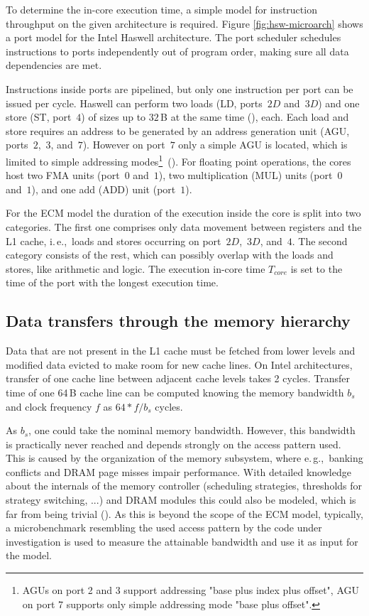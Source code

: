 To determine the in-core execution time, a simple model for instruction throughput on the given architecture is required. Figure \ref{fig:hsw-microarch} shows a port model for the Intel Haswell architecture. The port scheduler schedules instructions to ports independently out of program order, making sure all data dependencies are met.

Instructions inside ports are pipelined, but only one instruction per port can
be issued per cycle.
Haswell can perform two loads (LD, ports~$2D$ and~$3D$) and one store (ST,
port~$4$) of sizes up to $32$\,B at the same time (\cite{intel-orm-2016}), each.
Each load and store requires an address to be generated by an address
generation unit (AGU, ports~$2$,~$3$, and~$7$).
However on port~$7$ only a simple AGU is located, which is limited to simple
addressing modes\footnote{AGUs on port 2 and 3 support addressing "base plus index plus offset", AGU on port 7 supports only simple addressing mode "base plus offset".}~(\cite{intel-orm-2016,hofmann-2016-hsw}).
%
For floating point operations, the cores host two 
FMA units (port~$0$ and~$1$), two multiplication (MUL) units (port~$0$
and~$1$), and one add (ADD) unit (port~$1$).

For the ECM model the duration of the execution inside the core is split into
two categories.
The first one comprises only data movement between registers and the L1 cache,
i.\,e.,\ loads and stores occurring on port~$2D$,~$3D$, and~$4$.
The second category consists of the rest, which can possibly overlap with the
loads and stores, like arithmetic and logic.
The execution in-core time $T_{core}$ is set to the time of the port with the longest execution time.

\subsection*{Data transfers through the memory hierarchy}

Data that are not present in the L1 cache must be fetched from lower levels and modified data evicted to make room for new cache lines.
On Intel architectures, transfer of one cache line between adjacent cache levels takes 2 cycles.
Transfer time of one 64\,B cache line can be computed knowing the memory bandwidth $b_s$ and clock frequency $f$ as $64*f/b_s$ cycles.

As $b_s$, one could take the nominal memory bandwidth.
However, this bandwidth is practically never reached and depends strongly on the
access pattern used.
This is caused by the organization of the memory subsystem, where e.\,g.,\ banking
conflicts and DRAM page misses impair performance.
With detailed knowledge about the internals of the memory controller
(scheduling strategies, thresholds for strategy switching, ...) and DRAM modules
this could also be modeled, which is far from being trivial (\cite{jacob-2007}).
As this is beyond the scope of the ECM model, typically, a microbenchmark
resembling the used access pattern by the code under investigation is used
to measure the attainable bandwidth and use it as input for the model.

